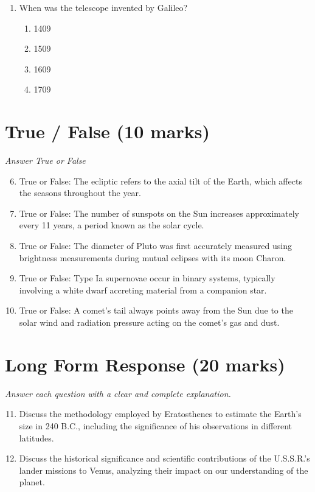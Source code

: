 \documentclass[12pt]{article}
\begin{document}
\begin{enumerate}[label=\arabic*.]
\begin{enumerate}[label=(\alph*)]
    \item 9.3 x 1013 meters
    \item 9.3 x 1010 meters
    \item 1.5 x 1014 meters
    \item 1.5 x 1017 meters
\end{enumerate}
\item When was the telescope invented by Galileo?
\begin{enumerate}[label=(\alph*)]
    \item 1409
    \item 1509
    \item 1609
    \item 1709
\end{enumerate}
\end{enumerate}

\section*{True / False (10 marks)}
\textit{Answer True or False}
\begin{enumerate}[label=\arabic*.]
\setcounter{enumi}{5}
\item True or False: The ecliptic refers to the axial tilt of the Earth, which affects the seasons throughout the year.
\item True or False: The number of sunspots on the Sun increases approximately every 11 years, a period known as the solar cycle.
\item True or False: The diameter of Pluto was first accurately measured using brightness measurements during mutual eclipses with its moon Charon.
\item True or False: Type Ia supernovae occur in binary systems, typically involving a white dwarf accreting material from a companion star.
\item True or False: A comet's tail always points away from the Sun due to the solar wind and radiation pressure acting on the comet's gas and dust.
\end{enumerate}

\section*{Long Form Response (20 marks)}
\textit{Answer each question with a clear and complete explanation.}
\begin{enumerate}[label=\arabic*.]
\setcounter{enumi}{10}
\item Discuss the methodology employed by Eratosthenes to estimate the Earth's size in 240 B.C.,
including the significance of his observations in different latitudes.
\item Discuss the historical significance and scientific contributions of the U.S.S.R.'s lander
missions to Venus, analyzing their impact on our understanding of the planet.
\end{enumerate}
\end{document}
